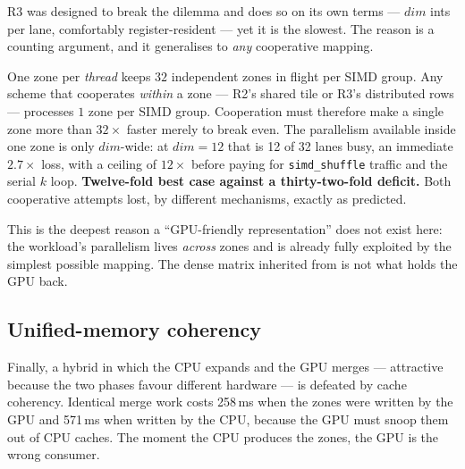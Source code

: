 R3 was designed to break the dilemma and does so on its own terms --- $\mathit{dim}$ ints per
lane, comfortably register-resident --- yet it is the slowest. The reason is a counting
argument, and it generalises to \emph{any} cooperative mapping.

One zone per \emph{thread} keeps $32$ independent zones in flight per SIMD group. Any scheme
that cooperates \emph{within} a zone --- R2's shared tile or R3's distributed rows --- processes
$1$ zone per SIMD group. Cooperation must therefore make a single zone more than $32\times$
faster merely to break even. The parallelism available inside one zone is only
$\mathit{dim}$-wide: at $\mathit{dim}=12$ that is 12 of 32 lanes busy, an immediate
$2.7\times$ loss, with a ceiling of $12\times$ before paying for \texttt{simd\_shuffle}
traffic and the serial $k$ loop. \textbf{Twelve-fold best case against a thirty-two-fold
deficit.} Both cooperative attempts lost, by different mechanisms, exactly as predicted.

This is the deepest reason a ``GPU-friendly representation'' does not exist here: the
workload's parallelism lives \emph{across} zones and is already fully exploited by the
simplest possible mapping. The dense matrix inherited from \uppaal{} is not what holds the
GPU back.

\subsection{Unified-memory coherency}

Finally, a hybrid in which the CPU expands and the GPU merges --- attractive because the two
phases favour different hardware --- is defeated by cache coherency. Identical merge work
costs 258\,ms when the zones were written by the GPU and 571\,ms when written by the CPU,
because the GPU must snoop them out of CPU caches. The moment the CPU produces the zones, the
GPU is the wrong consumer.

